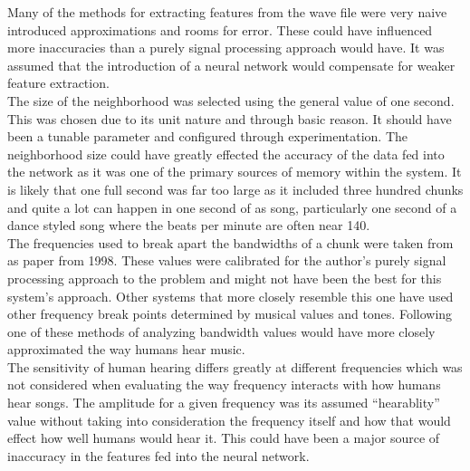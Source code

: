 Many of the methods for extracting features from the wave file were very naive introduced approximations and rooms for error. These could have influenced more inaccuracies than a purely signal processing approach would have. It was assumed that the introduction of a neural network would compensate for weaker feature extraction.\\

The size of the neighborhood was selected using the general value of one second. This was chosen due to its unit nature and through basic reason. It should have been a tunable parameter and configured through experimentation. The neighborhood size could have greatly effected the accuracy of the data fed into the network as it was one of the primary sources of memory within the system. It is likely that one full second was far too large as it included three hundred chunks and quite a lot can happen in one second of as song, particularly one second of a dance styled song where the beats per minute are often near 140.\\

The frequencies used to break apart the bandwidths of a chunk were taken from as paper from 1998. These values were calibrated for the author's purely signal processing approach to the problem and might not have been the best for this system's approach. Other systems that more closely resemble this one have used other frequency break points determined by musical values and tones. Following one of these methods of analyzing bandwidth values would have more closely approximated the way humans hear music.\\

The sensitivity of human hearing differs greatly at different frequencies which was not considered when evaluating the way frequency interacts with how humans hear songs. The amplitude for a given frequency was its assumed ``hearablity'' value without taking into consideration the frequency itself and how that would effect how well humans would hear it. This could have been a major source of inaccuracy in the features fed into the neural network.\\
